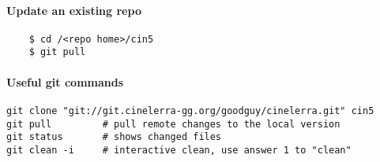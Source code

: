 \paragraph{Update an existing repo}%
\label{par:update_an_existing_repo}

\begin{lstlisting}
    $ cd /<repo home>/cin5
    $ git pull
\end{lstlisting}

\paragraph{Useful git commands}%
\label{par:useful_git_commands}


\begin{lstlisting}
git clone "git://git.cinelerra-gg.org/goodguy/cinelerra.git" cin5
git pull         # pull remote changes to the local version
git status       # shows changed files
git clean -i     # interactive clean, use answer 1 to "clean"
\end{lstlisting}





